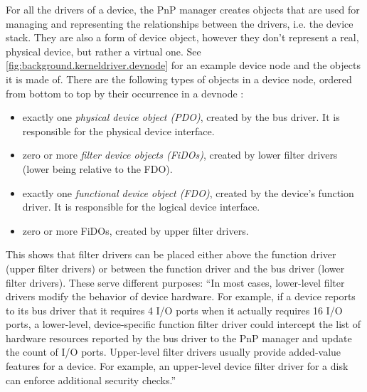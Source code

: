 For all the drivers of a device, the PnP manager creates objects that are used for managing and representing the relationships between the drivers, i.e. the device stack. They are also a form of device object, however they don't represent a real, physical device, but rather a virtual one. See \autoref{fig:background.kerneldriver.devnode} for an example device node and the objects it is made of. There are the following types of objects in a device node, ordered from bottom to top by their occurrence in a devnode \cite{Yosifovich2017}:
\begin{itemize}
	\item exactly one \emph{physical device object (PDO)}, created by the bus driver. It is responsible for the physical device interface.
	\item zero or more \emph{filter device objects (FiDOs)}, created by lower filter drivers (lower being relative to the FDO).
	\item exactly one \emph{functional device object (FDO)}, created by the device's function driver. It is responsible for the logical device interface.
	\item zero or more FiDOs, created by upper filter drivers.
\end{itemize}

This shows that filter drivers can be placed either above the function driver (upper filter drivers) or between the function driver and the bus driver (lower filter drivers). These serve different purposes: ``In most cases, lower-level filter drivers modify the behavior of device hardware. For example, if a device reports to its bus driver that it requires 4 I/O ports when it actually requires 16 I/O ports, a lower-level, device-specific function filter driver could intercept the list of hardware resources reported by the bus driver to the PnP manager and update the count of I/O ports. Upper-level filter drivers usually provide added-value features for a device. For example, an upper-level device filter driver for a disk can enforce additional security checks.'' \cite{Yosifovich2017}

